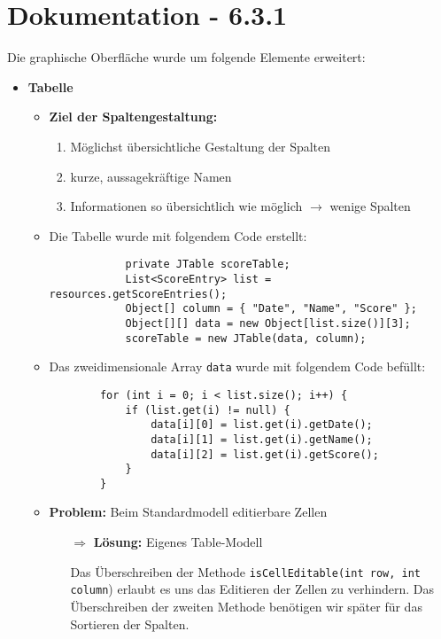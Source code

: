 \clearpage

\section{Dokumentation - 6.3.1}

Die graphische Oberfläche wurde um folgende Elemente erweitert:
\begin{itemize}
	\item  \textbf{Tabelle}
		\begin{itemize}
		\item \textbf{Ziel der Spaltengestaltung:}
			\begin{enumerate}
			\item Möglichst übersichtliche Gestaltung der Spalten
			\item kurze, aussagekräftige Namen
			\item Informationen so übersichtlich wie möglich $\rightarrow$ wenige Spalten
			\end{enumerate}
		\item Die Tabelle wurde mit folgendem Code erstellt:
		\begin{lstlisting}
			private JTable scoreTable;
			List<ScoreEntry> list = resources.getScoreEntries();
			Object[] column = { "Date", "Name", "Score" };
			Object[][] data = new Object[list.size()][3];
			scoreTable = new JTable(data, column);	
		\end{lstlisting} 
		
		\item Das zweidimensionale Array \texttt{data} wurde mit folgendem Code befüllt:
		\begin{lstlisting}
		for (int i = 0; i < list.size(); i++) {
			if (list.get(i) != null) {
				data[i][0] = list.get(i).getDate();
				data[i][1] = list.get(i).getName();
				data[i][2] = list.get(i).getScore();
			}
		}
		\end{lstlisting}
		
		\item \textbf{Problem:} Beim Standardmodell editierbare Zellen
			\begin{itemize}
				\item[$\Rightarrow$] \textbf{Lösung:} Eigenes Table-Modell
				\item[]
						Das Überschreiben der Methode \texttt{isCellEditable(int row, int column}) erlaubt es 
						uns das Editieren der Zellen zu verhindern. Das Überschreiben der zweiten Methode
						benötigen wir später für das Sortieren der Spalten.
			\end{itemize}
	

\end{itemize}
\end{itemize}
